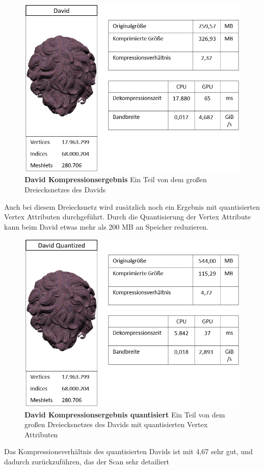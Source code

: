 \begin{figure}[htb]
  \centering  
  \includegraphics[scale=0.75]{Bilder/ergebnisse/david.png}
  \caption[David Kompressionsergebnis]{\textbf{David Kompressionsergebnis} Ein Teil von dem großen Dreiecksnetzes des Davids }
  \label{fig:david_ergebnis}
\end{figure}

Auch bei diesem Dreiecksnetz wird zusätzlich noch ein Ergebnis mit quantisierten Vertex Attributen durchgeführt.
Durch die Quantisierung der Vertex Attribute kann beim David etwas mehr als 200 MB an Speicher reduzieren.


\begin{figure}[htb]
  \centering  
  \includegraphics[scale=0.75]{Bilder/ergebnisse/david_q.png}
  \caption[David Kompressionsergebnis quantisiert]{\textbf{David Kompressionsergebnis quantisiert} Ein Teil von dem großen Dreiecksnetzes des Davids mit quantisierten Vertex Attributen }
  \label{fig:david_ergebnis}
\end{figure}

Das Kompressionsverhältnis des quantisierten Davids ist mit 4,67 sehr gut, und dadurch zurückzuführen, das der Scan sehr detailiert 